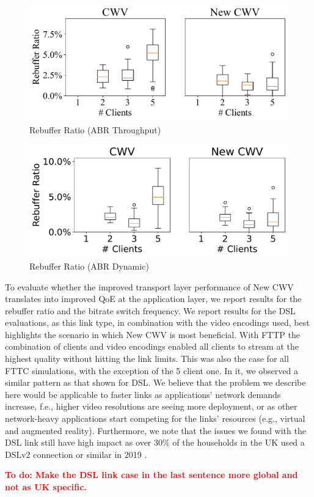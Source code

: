 \documentclass[10pt,sigconf]{acmart}
\newcommand{\todo}[1]{\textbf{\textcolor{red}{To do: #1}}}
\begin{document}
\begin{figure}
      \includegraphics[width=.45\textwidth, keepaspectratio]{figures/Rebuffer_Ratio.pdf}
    \caption{Rebuffer Ratio (ABR Throughput)}
    \label{fig:rebuffer-ratio}
\end{figure}

\begin{figure}
  \includegraphics[width=.45\textwidth, keepaspectratio]{figures/Rebuffer_Ratio_dynamic.pdf}
\caption{Rebuffer Ratio (ABR Dynamic)}
\label{fig:rebuffer-ratio-dynamic}
\end{figure}

To evaluate whether the improved transport layer performance of New CWV translates into improved QoE at the application layer, we report results for the rebuffer ratio and the bitrate switch frequency. We report results for the DSL evaluations, as this link type, in combination with the video encodings used, best highlights the scenario in which New CWV is most beneficial. With FTTP the combination of clients and video encodings enabled all clients to stream at the highest quality without hitting the link limits. This was also the case for all FTTC simulations, with the exception of the 5 client one. In it, we observed a similar pattern as that shown for DSL. We believe that the problem we describe here would be applicable to faster links as applications' network demands increase, f.e., higher video resolutions are seeing more deployment, or as other network-heavy applications start competing for the links' resources (e.g., virtual and augmented reality). Furthermore, we note that the issues we found with the DSL link still have high impact as over 30\% of the households in the UK used a DSLv2 connection or similar in 2019 \cite{online-ofcom-report}. 

\todo{Make the DSL link case in the last sentence more global and not as UK specific.}
\end{document}
